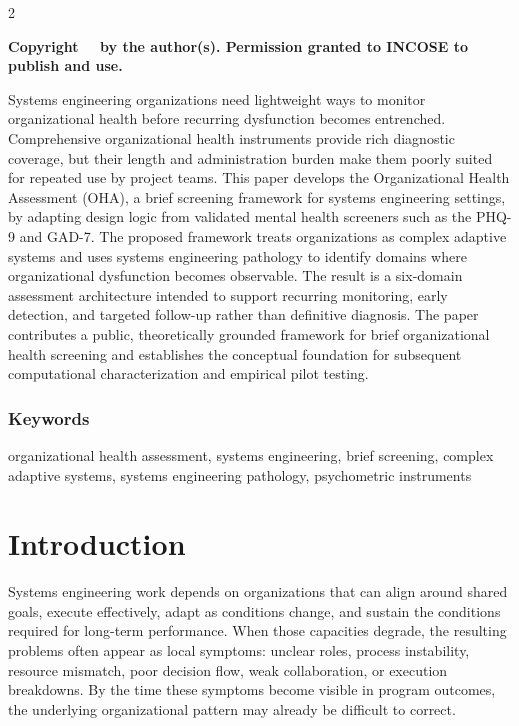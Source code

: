 \documentclass[11pt,letterpaper]{article}
\newcommand{\headingfont}{\sffamily}
\newcommand{\miniheading}[1]{%
  \par\noindent{\headingfont\bfseries\fontsize{12pt}{14pt}\selectfont #1}\par\vspace{4pt}%
}
\begin{document}
\begin{multicols*}{2}
\raggedcolumns

{\headingfont\bfseries\fontsize{8pt}{12pt}\selectfont
Copyright~\textcopyright~ \the\year{} by the author(s). Permission granted to INCOSE to publish and use.}
\\

\miniheading{Abstract}
Systems engineering organizations need lightweight ways to monitor organizational health before recurring dysfunction becomes entrenched. Comprehensive organizational health instruments provide rich diagnostic coverage, but their length and administration burden make them poorly suited for repeated use by project teams. This paper develops the Organizational Health Assessment (OHA), a brief screening framework for systems engineering settings, by adapting design logic from validated mental health screeners such as the PHQ-9 and GAD-7. The proposed framework treats organizations as complex adaptive systems and uses systems engineering pathology to identify domains where organizational dysfunction becomes observable. The result is a six-domain assessment architecture intended to support recurring monitoring, early detection, and targeted follow-up rather than definitive diagnosis. The paper contributes a public, theoretically grounded framework for brief organizational health screening and establishes the conceptual foundation for subsequent computational characterization and empirical pilot testing.

\subsubsection{Keywords}
organizational health assessment, systems engineering, brief screening, complex adaptive systems, systems engineering pathology, psychometric instruments

\section{Introduction}
Systems engineering work depends on organizations that can align around shared goals, execute effectively, adapt as conditions change, and sustain the conditions required for long-term performance. When those capacities degrade, the resulting problems often appear as local symptoms: unclear roles, process instability, resource mismatch, poor decision flow, weak collaboration, or execution breakdowns. By the time these symptoms become visible in program outcomes, the underlying organizational pattern may already be difficult to correct.


\end{multicols*}
\end{document}
